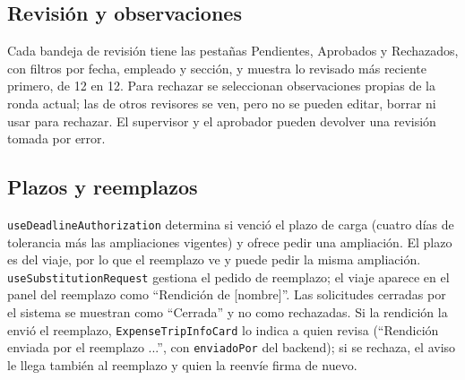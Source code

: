 \documentclass[11pt,letterpaper]{article}
\newcommand{\code}[1]{\nolinkurl{#1}}
\begin{document}
\subsection{Revisión y observaciones}
Cada bandeja de revisión tiene las pestañas Pendientes, Aprobados y Rechazados, con filtros por fecha, empleado y sección, y muestra lo revisado más reciente primero, de 12 en 12. Para rechazar se seleccionan observaciones propias de la ronda actual; las de otros revisores se ven, pero no se pueden editar, borrar ni usar para rechazar. El supervisor y el aprobador pueden devolver una revisión tomada por error.

\subsection{Plazos y reemplazos}
\code{useDeadlineAuthorization} determina si venció el plazo de carga (cuatro días de tolerancia más las ampliaciones vigentes) y ofrece pedir una ampliación. El plazo es del viaje, por lo que el reemplazo ve y puede pedir la misma ampliación. \code{useSubstitutionRequest} gestiona el pedido de reemplazo; el viaje aparece en el panel del reemplazo como ``Rendición de [nombre]''. Las solicitudes cerradas por el sistema se muestran como ``Cerrada'' y no como rechazadas. Si la rendición la envió el reemplazo, \code{ExpenseTripInfoCard} lo indica a quien revisa (``Rendición enviada por el reemplazo ...'', con \code{enviadoPor} del backend); si se rechaza, el aviso le llega también al reemplazo y quien la reenvíe firma de nuevo.
\end{document}

